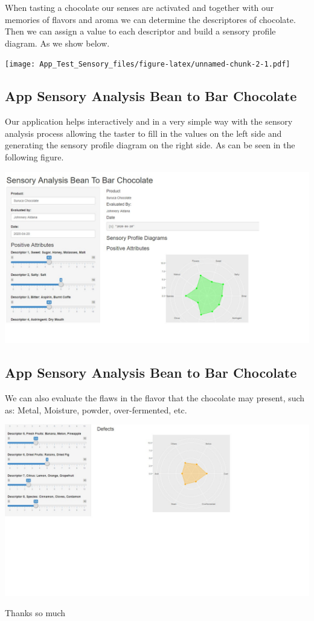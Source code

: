 \documentclass[]{article}
\begin{document}
When tasting a chocolate our senses are activated and together with our
memories of flavors and aroma we can determine the descriptores of
chocolate. Then we can assign a value to each descriptor and build a
sensory profile diagram. As we show below.

\texttt{[image: App\_Test\_Sensory\_files/figure-latex/unnamed-chunk-2-1.pdf]}

\hypertarget{app-sensory-analysis-bean-to-bar-chocolate}{%
\subsection{App Sensory Analysis Bean to Bar
Chocolate}\label{app-sensory-analysis-bean-to-bar-chocolate}}

Our application helps interactively and in a very simple way with the
sensory analysis process allowing the taster to fill in the values on
the left side and generating the sensory profile diagram on the right
side. As can be seen in the following figure.

\includegraphics[width=12.8in]{APP_Test_Sensory}

\hypertarget{app-sensory-analysis-bean-to-bar-chocolate-1}{%
\subsection{App Sensory Analysis Bean to Bar
Chocolate}\label{app-sensory-analysis-bean-to-bar-chocolate-1}}

We can also evaluate the flaws in the flavor that the chocolate may
present, such as: Metal, Moisture, powder, over-fermented, etc.

\includegraphics[width=12.8in]{App_Test_Sensory_2}

Thanks so much
\end{document}
